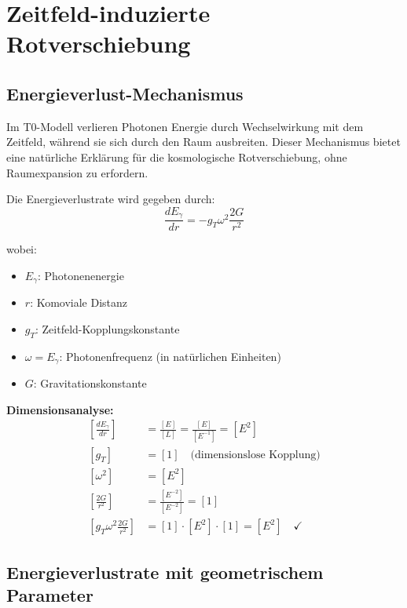 \documentclass[12pt,a4paper]{report}
\begin{document}
	\section{Zeitfeld-induzierte Rotverschiebung}
	\label{sec:timefield_redshift}
	
	\subsection{Energieverlust-Mechanismus}
	\label{subsec:energy_loss_mechanism}
	
	Im T0-Modell verlieren Photonen Energie durch Wechselwirkung mit dem Zeitfeld, während sie sich durch den Raum ausbreiten. Dieser Mechanismus bietet eine natürliche Erklärung für die kosmologische Rotverschiebung, ohne Raumexpansion zu erfordern.
	
	Die Energieverlustrate wird gegeben durch:
	\begin{equation}
		\frac{dE_\gamma}{dr} = -g_T \omega^2 \frac{2G}{r^2}
		\label{eq:photon_energy_loss}
	\end{equation}
	
	wobei:
	\begin{itemize}
		\item $E_\gamma$: Photonenenergie
		\item $r$: Komoviale Distanz
		\item $g_T$: Zeitfeld-Kopplungskonstante
		\item $\omega = E_\gamma$: Photonenfrequenz (in natürlichen Einheiten)
		\item $G$: Gravitationskonstante
	\end{itemize}
	
	\textbf{Dimensionsanalyse:}
	\begin{align}
		\left[\frac{dE_\gamma}{dr}\right] &= \frac{[E]}{[L]} = \frac{[E]}{[E^{-1}]} = [E^2] \\
		[g_T] &= [1] \quad \text{(dimensionslose Kopplung)} \\
		[\omega^2] &= [E^2] \\
		\left[\frac{2G}{r^2}\right] &= \frac{[E^{-2}]}{[E^{-2}]} = [1] \\
		\left[g_T \omega^2 \frac{2G}{r^2}\right] &= [1] \cdot [E^2] \cdot [1] = [E^2] \quad \checkmark
	\end{align}
	
\subsection{Energieverlustrate mit geometrischem Parameter}
\label{subsec:corrected_energy_loss_rate}
\end{document}
